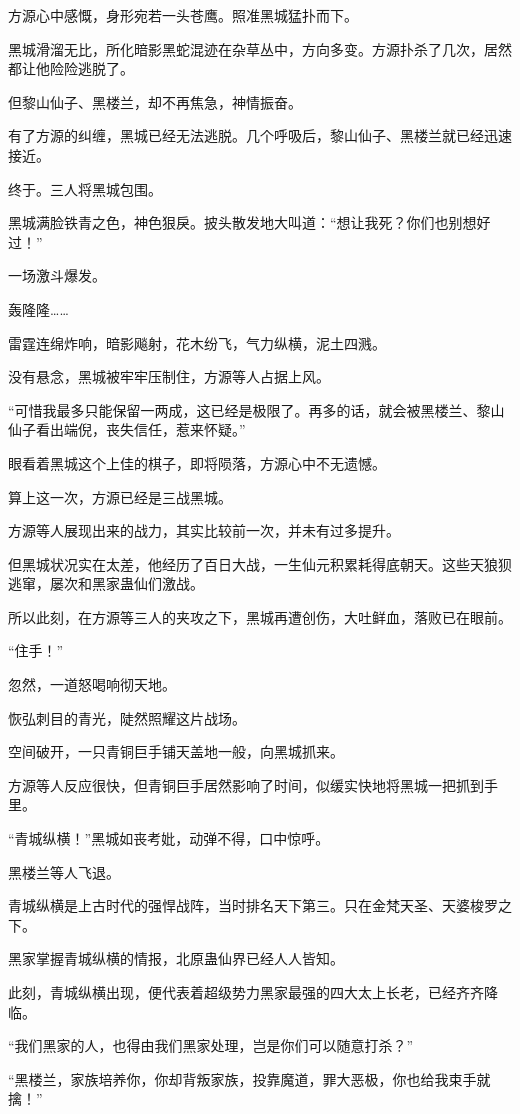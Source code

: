 \begin{this_body}
方源心中感慨，身形宛若一头苍鹰。照准黑城猛扑而下。

黑城滑溜无比，所化暗影黑蛇混迹在杂草丛中，方向多变。方源扑杀了几次，居然都让他险险逃脱了。

但黎山仙子、黑楼兰，却不再焦急，神情振奋。

有了方源的纠缠，黑城已经无法逃脱。几个呼吸后，黎山仙子、黑楼兰就已经迅速接近。

终于。三人将黑城包围。

黑城满脸铁青之色，神色狠戾。披头散发地大叫道：“想让我死？你们也别想好过！”

一场激斗爆发。

轰隆隆……

雷霆连绵炸响，暗影飚射，花木纷飞，气力纵横，泥土四溅。

没有悬念，黑城被牢牢压制住，方源等人占据上风。

“可惜我最多只能保留一两成，这已经是极限了。再多的话，就会被黑楼兰、黎山仙子看出端倪，丧失信任，惹来怀疑。”

眼看着黑城这个上佳的棋子，即将陨落，方源心中不无遗憾。

算上这一次，方源已经是三战黑城。

方源等人展现出来的战力，其实比较前一次，并未有过多提升。

但黑城状况实在太差，他经历了百日大战，一生仙元积累耗得底朝天。这些天狼狈逃窜，屡次和黑家蛊仙们激战。

所以此刻，在方源等三人的夹攻之下，黑城再遭创伤，大吐鲜血，落败已在眼前。

“住手！”

忽然，一道怒喝响彻天地。

恢弘刺目的青光，陡然照耀这片战场。

空间破开，一只青铜巨手铺天盖地一般，向黑城抓来。

方源等人反应很快，但青铜巨手居然影响了时间，似缓实快地将黑城一把抓到手里。

“青城纵横！”黑城如丧考妣，动弹不得，口中惊呼。

黑楼兰等人飞退。

青城纵横是上古时代的强悍战阵，当时排名天下第三。只在金梵天圣、天婆梭罗之下。

黑家掌握青城纵横的情报，北原蛊仙界已经人人皆知。

此刻，青城纵横出现，便代表着超级势力黑家最强的四大太上长老，已经齐齐降临。

“我们黑家的人，也得由我们黑家处理，岂是你们可以随意打杀？”

“黑楼兰，家族培养你，你却背叛家族，投靠魔道，罪大恶极，你也给我束手就擒！”


\end{this_body}
